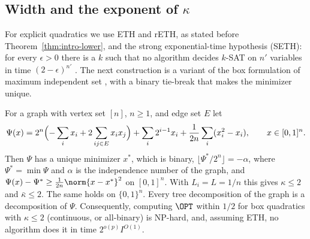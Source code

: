 \subsection{Width and the exponent of \texorpdfstring{$\kappa$}{kappa}}\label{sec:limits-width}

For explicit quadratics we use ETH and rETH, as stated before
Theorem~\ref{thm:intro-lower}, and the strong exponential-time hypothesis
(SETH): for every $\epsilon>0$ there is a $k$ such that no algorithm decides
$k$-SAT on $n'$ variables in time $(2-\epsilon)^{n'}$
\cite[Chapter~14]{CyganEtAl2015}. The next construction is a variant of the
box formulation of maximum independent set \cite{AbelloEtAl2001}, with a
binary tie-break that makes the minimizer unique.

\begin{proposition}
\label{prop:lbwidth}
For a graph with vertex set $[n]$, $n\ge1$, and edge set $E$ let
\[
\Psi(x)=2^n\Bigl(-\sum_ix_i+2\sum_{ij\in E}x_ix_j\Bigr)+\sum_i2^{i-1}x_i
+\frac1{2n}\sum_i(x_i^2-x_i),\qquad x\in[0,1]^n .
\]
Then $\Psi$ has a unique minimizer $x^*$, which is binary,
$\lfloor\Psi^*/2^n\rfloor=-\alpha$, where $\Psi^*=\min\Psi$ and $\alpha$ is
the independence number of the graph, and
$\Psi(x)-\Psi^*\ge\frac1{2n}\norm{x-x^*}^2$ on $[0,1]^n$. With $L_i=L=1/n$
this gives $\kappa\le2$ and $\bar\kappa\le2$. The same holds on
$\{0,1\}^n$. Every tree decomposition of the graph is a decomposition of
$\Psi$. Consequently, computing $\OPT$ within $1/2$ for box quadratics with
$\kappa\le2$ (continuous, or all-binary) is NP-hard, and, assuming ETH, no
algorithm does it in time $2^{o(p)}I^{O(1)}$.
\end{proposition}

